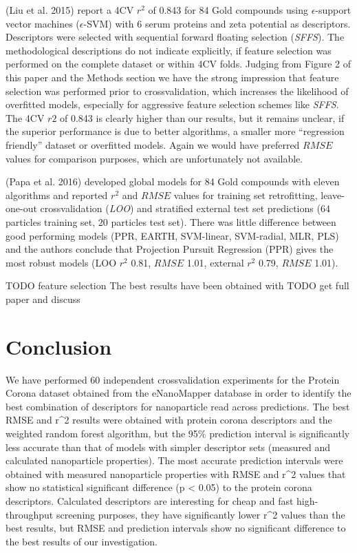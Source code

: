 \documentclass[utf8]{frontiersHLTH} %
\begin{document}
(Liu et al. 2015) report a 4CV \(r^2\) of 0.843 for 84 Gold compounds
using \(\epsilon\)-support vector machines (\(\epsilon\)-SVM) with 6
serum proteins and zeta potential as descriptors. Descriptors were
selected with sequential forward floating selection (\emph{SFFS}). The
methodological descriptions do not indicate explicitly, if feature
selection was performed on the complete dataset or within 4CV folds.
Judging from Figure 2 of this paper and the Methods section we have the
strong impression that feature selection was performed prior to
crossvalidation, which increases the likelihood of overfitted models,
especially for aggressive feature selection schemes like \emph{SFFS}.
The 4CV \(r2\) of 0.843 is clearly higher than our results, but it
remains unclear, if the superior performance is due to better
algorithms, a smaller more ``regression friendly'' dataset or overfitted
models. Again we would have preferred \(RMSE\) values for comparison
purposes, which are unfortunately not available.

(Papa et al. 2016) developed global models for 84 Gold compounds with
eleven algorithms and reported \(r^2\) and \(RMSE\) values for training
set retrofitting, leave-one-out crossvalidation (\emph{LOO}) and
stratified external test set predictions (64 particles training set, 20
particles test set). There was little difference between good performing
models (PPR, EARTH, SVM-linear, SVM-radial, MLR, PLS) and the authors
conclude that Projection Pursuit Regression (PPR) gives the most robust
models (LOO \(r^2\) 0.81, \(RMSE\) 1.01, external \(r^2\) 0.79, \(RMSE\)
1.01).

TODO feature selection The best results have been obtained with TODO get
full paper and discuss

\section{Conclusion}\label{conclusion}

We have performed 60 independent crossvalidation experiments for the
Protein Corona dataset obtained from the eNanoMapper database in order
to identify the best combination of descriptors for nanoparticle read
across predictions. The best RMSE and r\^{}2 results were obtained with
protein corona descriptors and the weighted random forest algorithm, but
the 95\% prediction interval is significantly less accurate than that of
models with simpler descriptor sets (measured and calculated
nanoparticle properties). The most accurate prediction intervals were
obtained with measured nanoparticle properties with RMSE and r\^{}2
values that show no statistical significant difference (p \textless{}
0.05) to the protein corona descriptors. Calculated descriptors are
interesting for cheap and fast high-throughput screening purposes, they
have significantly lower r\^{}2 values than the best results, but RMSE
and prediction intervals show no significant difference to the best
results of our investigation.
\end{document}
